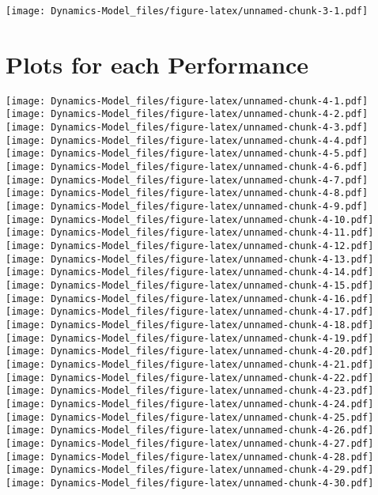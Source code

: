 \documentclass[12pt]{article}
\begin{document}
\texttt{[image: Dynamics-Model\_files/figure-latex/unnamed-chunk-3-1.pdf]}

\section{Plots for each Performance}
\label{appendixd}

\texttt{[image: Dynamics-Model\_files/figure-latex/unnamed-chunk-4-1.pdf]}
\texttt{[image: Dynamics-Model\_files/figure-latex/unnamed-chunk-4-2.pdf]}
\texttt{[image: Dynamics-Model\_files/figure-latex/unnamed-chunk-4-3.pdf]}
\texttt{[image: Dynamics-Model\_files/figure-latex/unnamed-chunk-4-4.pdf]}
\texttt{[image: Dynamics-Model\_files/figure-latex/unnamed-chunk-4-5.pdf]}
\texttt{[image: Dynamics-Model\_files/figure-latex/unnamed-chunk-4-6.pdf]}
\texttt{[image: Dynamics-Model\_files/figure-latex/unnamed-chunk-4-7.pdf]}
\texttt{[image: Dynamics-Model\_files/figure-latex/unnamed-chunk-4-8.pdf]}
\texttt{[image: Dynamics-Model\_files/figure-latex/unnamed-chunk-4-9.pdf]}
\texttt{[image: Dynamics-Model\_files/figure-latex/unnamed-chunk-4-10.pdf]}
\texttt{[image: Dynamics-Model\_files/figure-latex/unnamed-chunk-4-11.pdf]}
\texttt{[image: Dynamics-Model\_files/figure-latex/unnamed-chunk-4-12.pdf]}
\texttt{[image: Dynamics-Model\_files/figure-latex/unnamed-chunk-4-13.pdf]}
\texttt{[image: Dynamics-Model\_files/figure-latex/unnamed-chunk-4-14.pdf]}
\texttt{[image: Dynamics-Model\_files/figure-latex/unnamed-chunk-4-15.pdf]}
\texttt{[image: Dynamics-Model\_files/figure-latex/unnamed-chunk-4-16.pdf]}
\texttt{[image: Dynamics-Model\_files/figure-latex/unnamed-chunk-4-17.pdf]}
\texttt{[image: Dynamics-Model\_files/figure-latex/unnamed-chunk-4-18.pdf]}
\texttt{[image: Dynamics-Model\_files/figure-latex/unnamed-chunk-4-19.pdf]}
\texttt{[image: Dynamics-Model\_files/figure-latex/unnamed-chunk-4-20.pdf]}
\texttt{[image: Dynamics-Model\_files/figure-latex/unnamed-chunk-4-21.pdf]}
\texttt{[image: Dynamics-Model\_files/figure-latex/unnamed-chunk-4-22.pdf]}
\texttt{[image: Dynamics-Model\_files/figure-latex/unnamed-chunk-4-23.pdf]}
\texttt{[image: Dynamics-Model\_files/figure-latex/unnamed-chunk-4-24.pdf]}
\texttt{[image: Dynamics-Model\_files/figure-latex/unnamed-chunk-4-25.pdf]}
\texttt{[image: Dynamics-Model\_files/figure-latex/unnamed-chunk-4-26.pdf]}
\texttt{[image: Dynamics-Model\_files/figure-latex/unnamed-chunk-4-27.pdf]}
\texttt{[image: Dynamics-Model\_files/figure-latex/unnamed-chunk-4-28.pdf]}
\texttt{[image: Dynamics-Model\_files/figure-latex/unnamed-chunk-4-29.pdf]}
\texttt{[image: Dynamics-Model\_files/figure-latex/unnamed-chunk-4-30.pdf]}
\end{document}
